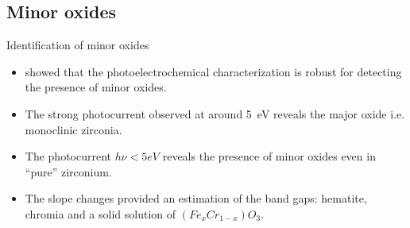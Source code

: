 \documentclass[10pt,compress]{beamer}
\begin{document}
\subsection{Minor oxides}
    \begin{frame}[allowframebreaks=1.0]{Identification of minor oxides}
        \begin{itemize}
            \item \citet{benaboud2007} showed that the photoelectrochemical characterization 
                  is robust for detecting the presence of minor oxides. 
            \item The strong photocurrent observed at around 5~eV 
                  reveals the major oxide i.e. monoclinic zirconia. 
            \item The photocurrent $h\nu < 5 eV$ reveals the presence of minor 
                  oxides even in “pure” zirconium. 
            \item The slope changes provided an estimation of the band gaps: 
                  hematite, chromia and a solid solution of $(Fe_xCr_{1-x})O_3$. 
        \end{itemize}


\end{frame}
\end{document}
